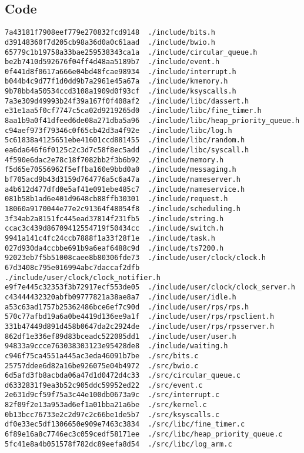 \documentclass{article}
\begin{document}
\subsection{Code}
\begin{verbatim}
7a43181f7908eef779e270832fcd9148  ./include/bits.h
d39148360f7d205cb98a36d0a0c61aad  ./include/bwio.h
65779c1b19758a33bae259538343ca1a  ./include/circular_queue.h
be2b7410d592676f04ff4d48aa5189b7  ./include/event.h
0f441d8f0617a666e04bd48fcae98934  ./include/interrupt.h
b044b4c9d77f1d0dd9b7a2961e45a67a  ./include/kmemory.h
9b78bb4a50534ccd3108a1909d0f93cf  ./include/ksyscalls.h
7a3e309d49993b24f39a167f0f408af2  ./include/libc/dassert.h
e31e1aa5f0cf7747c5ca02d9219265d0  ./include/libc/fine_timer.h
8aa1b9a0f41dfeed6de08a271dba5a96  ./include/libc/heap_priority_queue.h
c94aef973f79346c0f65cb42d3a4f92e  ./include/libc/log.h
5c61838a4125651ebe41601ccd881455  ./include/libc/random.h
ea6da646f6f0125c2c3d7c58f8ec5add  ./include/libc/syscall.h
4f590e6dac2e78c18f7082bb2f3b6b92  ./include/memory.h
f5d65e70556962f5effba160e9bbd0a0  ./include/messaging.h
bf705acd9b43d3159d764776a5c6a47a  ./include/nameserver.h
a4b612d477dfd0e5af41e091ebe485c7  ./include/nameservice.h
081b58b1ad6e401d9648cb88ffb30301  ./include/request.h
18060a9170044e77e2c91364f48054f8  ./include/scheduling.h
3f34ab2a8151fc445ead37814f231fb5  ./include/string.h
ccac3c439d86709412554719f50434cc  ./include/switch.h
9941a141c4fc24ccb7888f1a33f28f1e  ./include/task.h
027d930da4ccbbe691b9a6eaf6488c9d  ./include/ts7200.h
92023eb7f5b51008caee8b80306fde73  ./include/user/clock/clock.h
67d3408c795e016994abc7daccaf2dfb  ./include/user/clock/clock_notifier.h
e9f7e445c32353f3b72917ecf553de05  ./include/user/clock/clock_server.h
c43444432320abfb09777821a38ae8a7  ./include/user/idle.h
a53c63ad1757b25362486bce6ef7c90d  ./include/user/rps/rps.h
570c77afbd19a6a0be4419d136ee9a1f  ./include/user/rps/rpsclient.h
331b47449d891d458b0647da2c2924de  ./include/user/rps/rpsserver.h
862df1e336ef89d83bceadc522085dd1  ./include/user/user.h
94833a9ccce763038303123e95428de8  ./include/waiting.h
c946f75ca4551a445ac3eda46091b7be  ./src/bits.c
25757ddee6d82a16be926075e04b4972  ./src/bwio.c
6d5afd3fb8acbda06a47d1d0472d4c33  ./src/circular_queue.c
d6332831f9ea3b52c905ddc59952ed22  ./src/event.c
2e631d9cf59f75a3c44e100db0673a9c  ./src/interrupt.c
82f09f2e13a953ad6ef1a01bba21a6be  ./src/kernel.c
0b13bcc76733e2c2d97c2c66be1de5b7  ./src/ksyscalls.c
df0e33ec5df1306650e909e7463c3834  ./src/libc/fine_timer.c
6f89e16a8c7746ec3c059cedf58171ee  ./src/libc/heap_priority_queue.c
5fc41e8a4b051578f782dc89eefa8d54  ./src/libc/log_arm.c

\end{verbatim}
\end{document}
